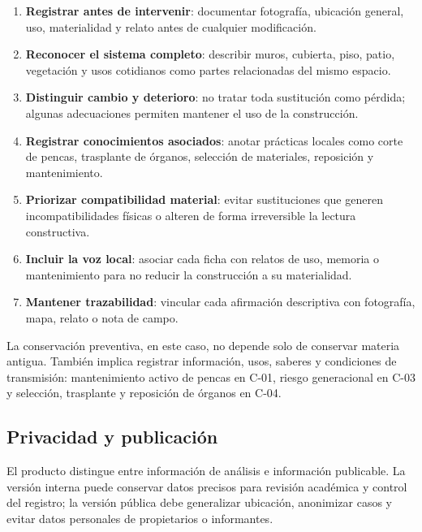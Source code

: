 \begin{enumerate}
	\item \textbf{Registrar antes de intervenir}: documentar fotografía, ubicación general, uso, materialidad y relato antes de cualquier modificación.
	\item \textbf{Reconocer el sistema completo}: describir muros, cubierta, piso, patio, vegetación y usos cotidianos como partes relacionadas del mismo espacio.
	\item \textbf{Distinguir cambio y deterioro}: no tratar toda sustitución como pérdida; algunas adecuaciones permiten mantener el uso de la construcción.
	\item \textbf{Registrar conocimientos asociados}: anotar prácticas locales como corte de pencas, trasplante de órganos, selección de materiales, reposición y mantenimiento.
	\item \textbf{Priorizar compatibilidad material}: evitar sustituciones que generen incompatibilidades físicas o alteren de forma irreversible la lectura constructiva.
	\item \textbf{Incluir la voz local}: asociar cada ficha con relatos de uso, memoria o mantenimiento para no reducir la construcción a su materialidad.
	\item \textbf{Mantener trazabilidad}: vincular cada afirmación descriptiva con fotografía, mapa, relato o nota de campo.
\end{enumerate}

La conservación preventiva, en este caso, no depende solo de conservar materia antigua. También implica registrar información, usos, saberes y condiciones de transmisión: mantenimiento activo de pencas en C-01, riesgo generacional en C-03 y selección, trasplante y reposición de órganos en C-04.

\subsection{Privacidad y publicación}

El producto distingue entre información de análisis e información publicable. La versión interna puede conservar datos precisos para revisión académica y control del registro; la versión pública debe generalizar ubicación, anonimizar casos y evitar datos personales de propietarios o informantes.

